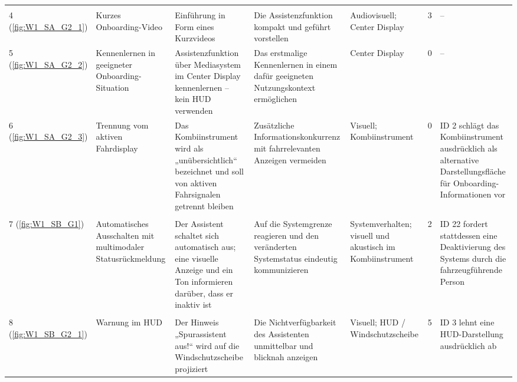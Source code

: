 {\begin{xltabular}{\textwidth}{
    P{0.65cm}
    Y
    Y
    Y
    P{1.75cm}
    P{1.25cm}
    Y
}
\rowrule
{}
\\
\rowrule

4 (\ref{fig:W1_SA_G2_1}) &
Kurzes Onboarding-Video &
Einführung in Form eines Kurzvideos &
Die Assistenzfunktion kompakt und geführt vorstellen &
Audiovisuell; Center Display &
3 &
--
\\

\rowrule

5 (\ref{fig:W1_SA_G2_2}) &
Kennenlernen in geeigneter Onboarding-Situation &
Assistenzfunktion über Mediasystem im Center Display kennenlernen -- kein HUD verwenden &
Das erstmalige Kennenlernen in einem dafür geeigneten Nutzungskontext ermöglichen &
Center Display &
0 &
--
\\

\rowrule

6 (\ref{fig:W1_SA_G2_3}) &
Trennung vom aktiven Fahrdisplay &
Das Kombiinstrument wird als „unübersichtlich“ bezeichnet und soll von aktiven Fahrsignalen getrennt bleiben &
Zusätzliche Informationskonkurrenz mit fahrrelevanten Anzeigen vermeiden &
Visuell; Kombiinstrument &
0 &
ID 2 schlägt das Kombiinstrument ausdrücklich als alternative Darstellungsfläche für Onboarding-Informationen vor
\\

\rowrule
{}
\\
\rowrule

7 (\ref{fig:W1_SB_G1}) &
Automatisches Ausschalten mit multimodaler Statusrückmeldung &
Der Assistent schaltet sich automatisch aus; eine visuelle Anzeige und ein Ton informieren darüber, dass er inaktiv ist &
Auf die Systemgrenze reagieren und den veränderten Systemstatus eindeutig kommunizieren &
Systemverhalten; visuell und akustisch im Kombiinstrument &
2 &
ID 22 fordert stattdessen eine Deaktivierung des Systems durch die fahrzeugführende Person
\\

\rowrule
{}
\\
\rowrule

8 (\ref{fig:W1_SB_G2_1}) &
Warnung im HUD &
Der Hinweis „Spurassistent aus!“ wird auf die Windschutzscheibe projiziert &
Die Nichtverfügbarkeit des Assistenten unmittelbar und blicknah anzeigen &
Visuell; HUD / Windschutzscheibe &
5 &
ID 3 lehnt eine HUD-Darstellung ausdrücklich ab
\\


\end{xltabular}}
